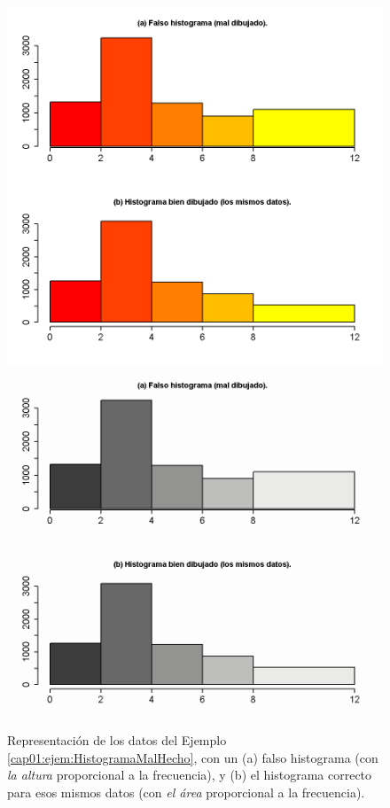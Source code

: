 \begin{ejemplo}
\begin{figure}[hbpt]
\centering
\begin{enColor}
\includegraphics[width=12cm]{../fig/Cap01-HistogramaMalHecho.png}
\end{enColor}
\begin{bn}
\includegraphics[width=12cm]{../fig/Cap01-HistogramaMalHecho-bn.png}
\end{bn}
\caption{Representación de los datos del Ejemplo \ref{cap01:ejem:HistogramaMalHecho}, con un (a) falso histograma (con {\em la altura} proporcional a la frecuencia), y (b) el histograma correcto para esos mismos datos (con {\em el área} proporcional a la frecuencia).}
\label{cap01:fig:Histograma}
\end{figure}
\end{ejemplo}

